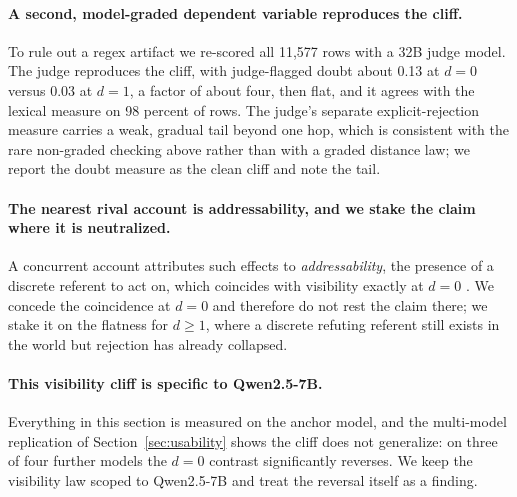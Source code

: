 \paragraph{A second, model-graded dependent variable reproduces the
cliff.} To rule out a regex artifact we re-scored all 11{,}577 rows with a
32B judge model. The judge reproduces the cliff, with judge-flagged doubt
about 0.13 at $d{=}0$ versus 0.03 at $d{=}1$, a factor of about four, then
flat, and it agrees with the lexical measure on 98 percent of rows.
The judge's separate explicit-rejection measure carries a weak, gradual
tail beyond one hop, which is consistent with the rare non-graded checking
above rather than with a graded distance law; we report the doubt measure
as the clean cliff and note the tail.

\paragraph{The nearest rival account is addressability, and we stake the
claim where it is neutralized.} A concurrent account attributes such
effects to \emph{addressability}, the presence of a discrete referent to
act on, which coincides with visibility exactly at $d{=}0$
\citep{chen2026selfcorrection}. We concede the coincidence at $d{=}0$ and
therefore do not rest the claim there; we stake it on the flatness for
$d\ge1$, where a discrete refuting referent still exists in the world but
rejection has already collapsed.

\paragraph{This visibility cliff is specific to Qwen2.5-7B.} Everything in
this section is measured on the anchor model, and the multi-model
replication of Section~\ref{sec:usability} shows the cliff does not
generalize: on three of four further models the $d{=}0$ contrast
significantly reverses. We keep the visibility law scoped to Qwen2.5-7B and
treat the reversal itself as a finding.

